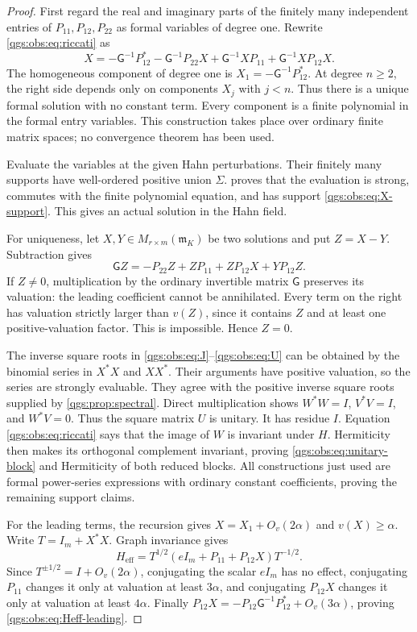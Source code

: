 \documentclass[11pt,oneside]{article}
\numberwithin{equation}{section}
\theoremstyle{plain}
\theoremstyle{definition}
\theoremstyle{remark}
\newcommand{\mm}{\mathfrak m}
\newcommand{\Gap}{\mathsf G}
\newcommand{\Heff}{H_{\mathrm{eff}}}
\newcommand{\Oval}[1]{O_{v}(#1)}
\begin{document}
\begin{proof}
First regard the real and imaginary parts of the finitely many independent entries of $P_{11},P_{12},P_{22}$ as formal variables of degree one. Rewrite \eqref{qgs:obs:eq:riccati} as
\begin{equation}\label{qgs:obs:eq:graph-recursion}
 X=-\Gap^{-1}P_{12}^*-\Gap^{-1}P_{22}X
       +\Gap^{-1}XP_{11}+\Gap^{-1}XP_{12}X.
\end{equation}
The homogeneous component of degree one is $X_1=-\Gap^{-1}P_{12}^*$. At degree $n\ge2$, the right side depends only on components $X_j$ with $j<n$. Thus there is a unique formal solution with no constant term. Every component is a finite polynomial in the formal entry variables. This construction takes place over ordinary finite matrix spaces; no convergence theorem has been used.

Evaluate the variables at the given Hahn perturbations. Their finitely many supports have well-ordered positive union $\Sigma$.  proves that the evaluation is strong, commutes with the finite polynomial equation, and has support \eqref{qgs:obs:eq:X-support}. This gives an actual solution in the Hahn field.

For uniqueness, let $X,Y\in M_{r\times m}(\mm_K)$ be two solutions and put $Z=X-Y$. Subtraction gives
\[
 \Gap Z=-P_{22}Z+ZP_{11}+ZP_{12}X+YP_{12}Z.
\]
If $Z\ne0$, multiplication by the ordinary invertible matrix $\Gap$ preserves its valuation: the leading coefficient cannot be annihilated. Every term on the right has valuation strictly larger than $v(Z)$, since it contains $Z$ and at least one positive-valuation factor. This is impossible. Hence $Z=0$.

The inverse square roots in \eqref{qgs:obs:eq:J}--\eqref{qgs:obs:eq:U} can be obtained by the binomial series in $X^*X$ and $XX^*$. Their arguments have positive valuation, so the series are strongly evaluable. They agree with the positive inverse square roots supplied by \cref{qgs:prop:spectral}. Direct multiplication shows $W^*W=I$, $V^*V=I$, and $W^*V=0$. Thus the square matrix $U$ is unitary. It has residue $I$. Equation \eqref{qgs:obs:eq:riccati} says that the image of $W$ is invariant under $H$. Hermiticity then makes its orthogonal complement invariant, proving \eqref{qgs:obs:eq:unitary-block} and Hermiticity of both reduced blocks. All constructions just used are formal power-series expressions with ordinary constant coefficients, proving the remaining support claims.

For the leading terms, the recursion gives $X=X_1+\Oval{2\alpha}$ and $v(X)\ge\alpha$. Write $T=I_m+X^*X$. Graph invariance gives
\begin{equation}\label{qgs:obs:eq:Heff-exact}
 \Heff=T^{1/2}(eI_m+P_{11}+P_{12}X)T^{-1/2}.
\end{equation}
Since $T^{\pm1/2}=I+\Oval{2\alpha}$, conjugating the scalar $eI_m$ has no effect, conjugating $P_{11}$ changes it only at valuation at least $3\alpha$, and conjugating $P_{12}X$ changes it only at valuation at least $4\alpha$. Finally $P_{12}X=-P_{12}\Gap^{-1}P_{12}^*+\Oval{3\alpha}$, proving \eqref{qgs:obs:eq:Heff-leading}.
\end{proof}
\end{document}

